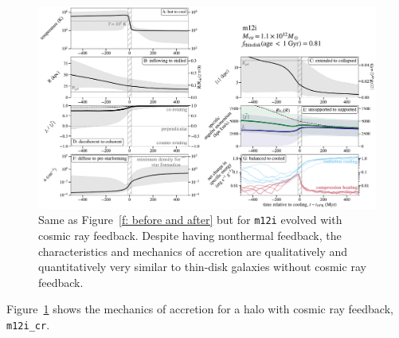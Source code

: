 \documentclass[fleqn,usenatbib]{mnras}
\newcommand{\Rcon}{R_{T=10^5\,{\rm K}}}
\begin{document}
\begin{figure}
\includegraphics[width=\textwidth]{figures/before_and_after/before_and_after_m12i_cr.pdf}
\caption{
Same as Figure~\ref{f: before and after} but for \texttt{m12i} evolved with cosmic ray feedback.
Despite having nonthermal feedback, the characteristics and mechanics of accretion are qualitatively and quantitatively very similar to thin-disk galaxies without cosmic ray feedback.
}
\label{f: before and after -- cr}
\end{figure}

Figure~\ref{f: before and after -- cr} shows the mechanics of accretion for a halo with cosmic ray feedback, \texttt{m12i\_cr}.





\bsp	%
\label{lastpage}
\end{document}
